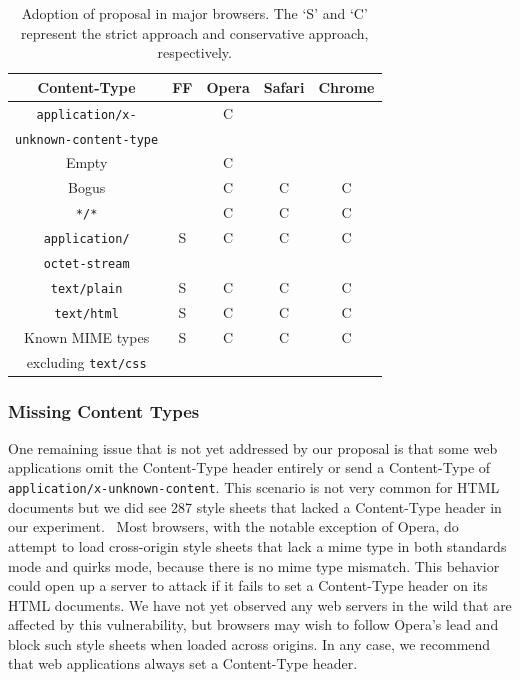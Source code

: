 \documentclass{acm_proc_article-sp}
\begin{document}
\begin{table}
\centering
\begin{tabular}{|c|c|c|c|c|} \hline
Content-Type&FF&Opera&Safari&Chrome\\ \hline
\texttt{application/x-}&&C&&\\ 
\texttt{unknown-content-type}&&&&\\ \hline
Empty&&C&&\\ \hline
Bogus&&C&C&C \\ \hline
\texttt{*/*}&&C&C&C \\ \hline
\texttt{application/}&S&C&C&C\\ 
\texttt{octet-stream}&&&&\\ \hline
\texttt{text/plain}&S&C&C&C\\ \hline
\texttt{text/html}&S&C&C&C\\ \hline
Known MIME types&S&C&C&C\\
excluding \texttt{text/css}&&&&\\
\hline\end{tabular}
\caption{Adoption of proposal in major browsers. The `S' and `C' represent the strict approach and conservative approach, respectively.}
\label{table:adoption}
\end{table}

\subsubsection{Missing Content Types}

One remaining issue that is not yet addressed by our proposal is that some web
applications omit the Content-Type header entirely or send a Content-Type of
\verb|application/x-unknown-content|. This scenario is not very common for
HTML documents but we did see 287 style sheets that lacked a Content-Type
header in our experiment.~ Most browsers,
with the notable exception of Opera, do attempt to load cross-origin
style sheets that lack a mime type in both standards mode and quirks mode,
because there is no mime type mismatch. This behavior could open up a server
to attack if it fails to set a Content-Type header on its HTML documents. We
have not yet observed any web servers in the wild that are affected by this
vulnerability, but browsers may wish to follow Opera's lead and block such
style sheets when loaded across origins. In any case, we recommend that web
applications always set a Content-Type header.
\end{document}
